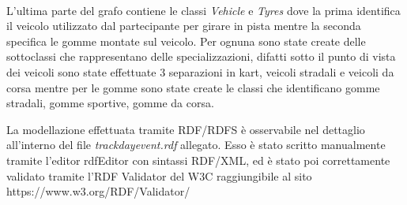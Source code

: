 \\\par
L'ultima parte del grafo contiene le classi \textit{Vehicle} e \textit{Tyres} dove la prima identifica il veicolo utilizzato dal partecipante per girare in pista mentre la seconda specifica le gomme montate sul veicolo. Per ognuna sono state create delle sottoclassi che rappresentano delle specializzazioni, difatti sotto il punto di vista dei veicoli sono state effettuate 3 separazioni in kart, veicoli stradali e veicoli da corsa mentre per le gomme sono state create le classi che identificano gomme stradali, gomme sportive, gomme da corsa.
\\\par
La modellazione effettuata tramite RDF/RDFS è osservabile nel dettaglio all'interno del file \textit{trackdayevent.rdf} allegato. Esso è stato scritto manualmente tramite l'editor rdfEditor con sintassi RDF/XML, ed è stato poi correttamente validato tramite l'RDF Validator del W3C raggiungibile al sito https://www.w3.org/RDF/Validator/
